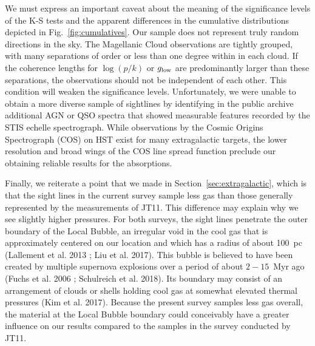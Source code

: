 \documentclass[modern]{aastex63}
\begin{document}
We must express an important caveat about the meaning of the significance levels of the K-S 
tests and the apparent differences in the cumulative distributions depicted in 
Fig.~\ref{fig:cumulatives}.  Our sample does not represent truly random directions in the sky.  
The Magellanic Cloud observations are tightly grouped, with many separations of order or less 
than one degree within in each cloud.  If the coherence lengths for $\log(p/k)$ or $g_{\rm 
low}$ are predominantly larger than these separations, the observations should not be 
independent of each other.  This condition will weaken the significance levels.  Unfortunately, 
we were unable to obtain a more diverse sample of sightlines by identifying in the public 
archive additional AGN or QSO spectra that showed measurable  features recorded by 
the STIS echelle spectrograph.  While observations by the Cosmic Origins Spectrograph (COS) on 
HST exist for many extragalactic targets, the lower resolution and broad wings of the COS line 
spread function preclude our obtaining reliable results for the  absorptions. 

Finally, we reiterate a point that we made in Section~\ref{sec:extragalactic}, which is that the 
sight lines in the current survey sample less gas than those generally represented by the 
measurements of JT11.  This difference may explain why we see slightly higher pressures.  For 
both surveys, the sight lines penetrate the outer boundary of the Local Bubble, an irregular void 
in the cool gas that is approximately centered on our location and which has a radius of about 
100~pc (Lallement et al. 2013 ; Liu et al. 2017).  This bubble is believed to have been created by 
multiple supernova explosions over a period of about $2-15$~Myr ago (Fuchs et al. 2006 ; 
Schulreich et al. 2018).  Its boundary may consist of an arrangement of clouds or shells holding 
cool gas at somewhat elevated thermal pressures (Kim et al. 2017).  Because the present survey 
samples less gas overall, the material at the Local Bubble boundary could conceivably have a 
greater influence on our results compared to the samples in the survey conducted by JT11.
\end{document}
